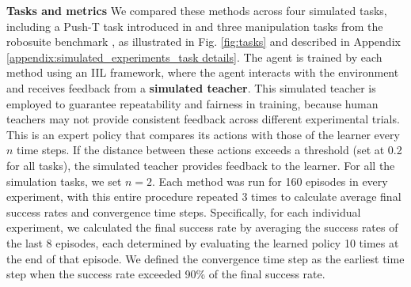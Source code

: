 


\textbf{Tasks and metrics} We compared these methods across four simulated tasks, including a Push-T task introduced in \cite{2023_diffusionpolicy} and three manipulation tasks from the robosuite benchmark \citep{2020_robosuite}, as illustrated in Fig. \ref{fig:tasks} and described in Appendix \ref{appendix:simulated_experiments_task details}.
The agent is trained by each method using an IIL framework, where the agent interacts with the environment and receives feedback from a \textbf{simulated teacher}.
This simulated teacher is employed to guarantee repeatability and fairness in training, because human teachers may not provide consistent feedback across different experimental trials. 
This is an expert policy that compares its actions with those of the learner every $n$ time steps. If the distance between these actions exceeds a threshold (set at 0.2 for all tasks), the simulated teacher provides feedback to the learner.  For all the simulation tasks, we set $n=2$.
 Each method was run for 160 episodes in every experiment, with this entire procedure repeated 3 times to calculate average final success rates and convergence time steps. 
Specifically, for each individual experiment, we calculated the final success rate by averaging the success rates of the last 8 episodes, each determined by evaluating the learned policy 10 times at the end of that episode.
We defined the convergence time step as the earliest time step when the success rate exceeded 90\% of the final success rate.

